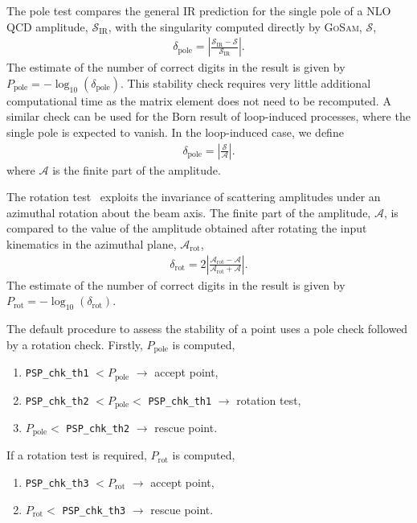 \documentclass[11pt,a4paper]{refrep}
\newcommand{\gosam}{\textsc{GoSam}\xspace}
\begin{document}
The pole test compares the general IR prediction for the single pole of a NLO QCD amplitude, $\mathcal{S}_\mathrm{IR}$, with the singularity computed directly by \gosam, $\mathcal{S}$,
\begin{align}
\delta_\mathrm{pole} = \left| \frac{\mathcal{S}_\mathrm{IR} - \mathcal{S}}{{\mathcal{S}_\mathrm{IR}}} \right|.
\end{align}
The estimate of the number of correct digits in the result is given by $P_\mathrm{pole} = - \log_{10} ( \delta_\mathrm{pole})$.
This stability check requires very little additional computational time as the matrix element does not need to be recomputed.
A similar check can be used for the Born result of loop-induced processes, where the single pole is expected to vanish.
In the loop-induced case, we define
\begin{align}
\delta_\mathrm{pole} = \left| \frac{\mathcal{S}}{\mathcal{A}} \right|.
\end{align}
where $\mathcal{A}$ is the finite part of the amplitude.

The rotation test~\cite{vanDeurzen:2013saa} exploits the invariance of scattering amplitudes under an azimuthal rotation about the beam axis.
The finite part of the amplitude, $\mathcal{A}$, is compared to the value of the amplitude obtained after rotating the input kinematics in the azimuthal plane, $\mathcal{A}_\mathrm{rot}$,
\begin{align}
\delta_\mathrm{rot} = 2 \left| \frac{\mathcal{A}_\mathrm{rot}-\mathcal{A}}{\mathcal{A}_\mathrm{rot}+\mathcal{A}} \right|.
\end{align}
The estimate of the number of correct digits in the result is given by $P_\mathrm{rot} = - \log_{10} ( \delta_\mathrm{rot})$.

The default procedure to assess the stability of a point uses a pole check followed by a rotation check.
Firstly, $P_\mathrm{pole}$ is computed,
\begin{enumerate}
\item \texttt{PSP\_chk\_th1} $< P_\mathrm{pole}$ $\rightarrow$ accept point,
\item \texttt{PSP\_chk\_th2} $< P_\mathrm{pole} < $ \texttt{PSP\_chk\_th1} $\rightarrow$ rotation test,
\item $P_\mathrm{pole} <$ \texttt{PSP\_chk\_th2} $\rightarrow$ rescue point.
\end{enumerate}
If a rotation test is required, $P_\mathrm{rot}$ is computed,
\begin{enumerate}
\item \texttt{PSP\_chk\_th3} $< P_\mathrm{rot}$ $\rightarrow$ accept point,
\item  $P_\mathrm{rot} <$ \texttt{PSP\_chk\_th3} $\rightarrow$ rescue point.
\end{enumerate}
\end{document}
